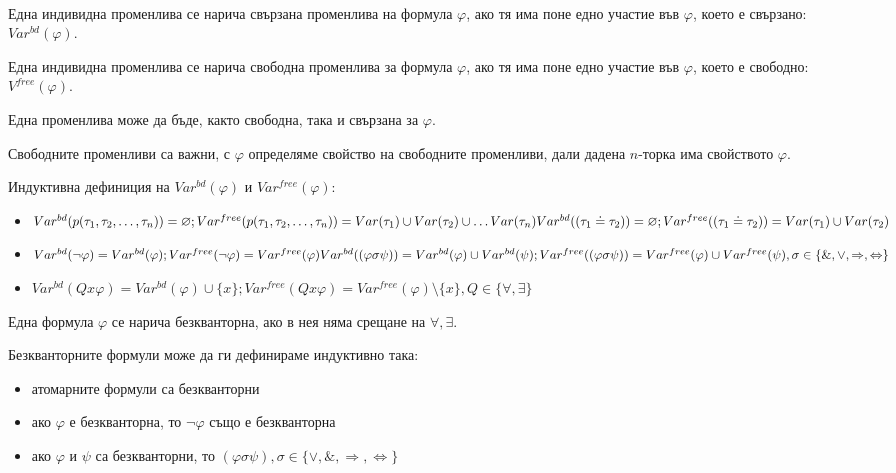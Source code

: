 \documentclass{article}
\begin{document}
\begin{mydef}
$\ $

Една индивидна променлива се нарича свързана променлива на формула $\varphi$, ако тя има поне едно участие във $\varphi$, което е свързано: $Var^{bd}(\varphi)$.

Една индивидна променлива се нарича свободна променлива за формула $\varphi$, ако тя има поне едно участие във $\varphi$, което е свободно: $V^{free}(\varphi)$.

\begin{remark}
Една променлива може да бъде, както свободна, така и свързана за $\varphi$.
\end{remark}

\begin{remark}
Свободните променливи са важни, с $\varphi$ определяме свойство на свободните променливи, дали дадена $n$-торка има свойството $\varphi$.
\end{remark}
\end{mydef}

\begin{mydef}
Индуктивна дефиниция на $Var^{bd}(\varphi)$ и $Var^{free}(\varphi)$:

\begin{itemize}
\item $Var^{bd}(p(\tau_1, \tau_2, \ldots, \tau_n)) = \varnothing; Var^{free}(p(\tau_1, \tau_2, \ldots, \tau_n)) = Var(\tau_1) \cup Var(\tau_2) \cup \ldots Var(\tau_n) \\ Var^{bd}((\tau_1 \doteq \tau_2)) = \varnothing; Var^{free}((\tau_1 \doteq \tau_2)) = Var(\tau_1) \cup Var(\tau_2)$
\item $Var^{bd}(\neg\varphi) = Var^{bd}(\varphi); Var^{free}(\neg\varphi) = Var^{free}(\varphi) \\ Var^{bd}((\varphi \sigma \psi)) = Var^{bd}(\varphi) \cup Var^{bd}(\psi); Var^{free}((\varphi \sigma \psi)) = Var^{free}(\varphi) \cup Var^{free}(\psi), \\ \sigma \in \{\&, \lor, \Rightarrow, \Leftrightarrow\}$
\item $Var^{bd}(Qx\varphi) = Var^{bd}(\varphi) \cup \{x\}; Var^{free}(Qx\varphi) = Var^{free}(\varphi) \setminus \{x\}, Q \in \{\forall, \exists\}$
\end{itemize}
\end{mydef}

\begin{mydef}
Една формула $\varphi$ се нарича безкванторна, ако в нея няма срещане на $\forall, \exists$.

Безкванторните формули може да ги дефинираме индуктивно така:
\begin{itemize}
\item атомарните формули са безкванторни
\item ако $\varphi$ е безкванторна, то $\neg\varphi$ също е безкванторна
\item ако $\varphi$ и $\psi$ са безкванторни, то $(\varphi \sigma \psi), \sigma \in \{\lor, \&, \Rightarrow, \Leftrightarrow\}$
\end{itemize}
\end{mydef}
\end{document}
